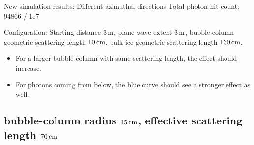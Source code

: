 \begin{frame}[fragile]{New simulation results: Different azimuthal directions}
  \tiny Total photon hit count: 94866 / 1e7

  \tiny Configuration: Starting distance $3\text{\,m}$, plane-wave extent $3\text{\,m}$, bubble-column geometric scattering length $10\text{\,cm}$, bulk-ice geometric scattering length $130\text{\,cm}$.
  \normalsize

  \begin{itemize}
    \item For a larger bubble column with same scattering length, the effect should increase. \checkmark
    \item For photons coming from below, the blue curve should see a stronger effect as well. \checkmark
  \end{itemize}
\end{frame}

\subsection{bubble-column radius $15\text{\,cm}$, effective scattering length $70\text{\,cm}$}
